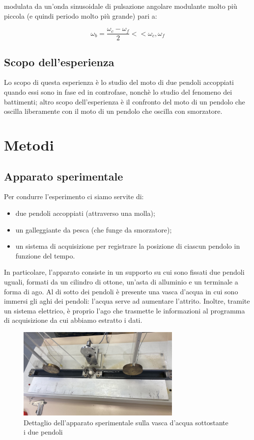 \documentclass{article}
\begin{document}
modulata da un'onda sinusoidale di pulsazione angolare modulante molto più piccola (e quindi periodo molto più grande) pari a:

\begin{equation}
    \omega_b = \frac{\omega_c - \omega_f}{2} << \omega_c, \omega_f
\end{equation}

\vspace{1em}

\subsection{Scopo dell'esperienza}
Lo scopo di questa esperienza è lo studio del moto di due pendoli accoppiati quando essi sono in fase ed in controfase, nonchè lo studio del fenomeno dei battimenti; altro scopo dell'esperienza è il confronto del moto di un pendolo che oscilla liberamente con il moto di un pendolo che oscilla con smorzatore.

\vspace{2em}

\section{Metodi}
\subsection{Apparato sperimentale}
Per condurre l'esperimento ci siamo servite di:
\begin{itemize}
    \item due pendoli accoppiati (attraverso una molla);
    \item un galleggiante da pesca (che funge da smorzatore);
    \item un sistema di acquisizione per registrare la posizione di ciascun pendolo in funzione del tempo.
\end{itemize}
In particolare, l'apparato consiste in un supporto su cui sono fissati due pendoli uguali, formati da un cilindro di ottone, un'asta di alluminio e un terminale a forma di ago. Al di sotto dei pendoli è presente una vasca d'acqua in cui sono immersi gli aghi dei pendoli: l'acqua serve ad aumentare l'attrito. Inoltre, tramite un sistema elettrico, è proprio l'ago che trasmette le informazioni al programma di acquisizione da cui abbiamo estratto i dati.

\begin{figure} [H]
    \centering
    \includegraphics[width=8cm]{pendoli.jpg}
    \caption{Dettaglio dell'apparato sperimentale sulla vasca d'acqua sottostante i due pendoli}
    \label{fig:my_label}
\end{figure}
\end{document}
